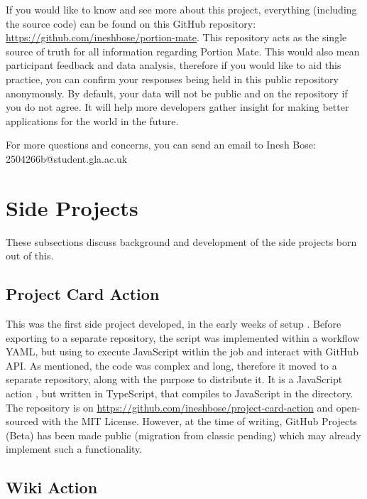 \documentclass[../main.tex]{subfiles}
\begin{document}
If you would like to know and see more about this project, everything (including the source code) can be found on this GitHub repository: \href{https://github.com/ineshbose/portion-mate}{https://github.com/ineshbose/portion-mate}. This repository acts as the single source of truth for all information regarding Portion Mate. This would also mean participant feedback and data analysis, therefore if you would like to aid this practice, you can confirm your responses being held in this public repository anonymously. By default, your data will not be public and on the repository if you do not agree. It will help more developers gather insight for making better applications for the world in the future.

For more questions and concerns, you can send an email to Inesh Bose: 2504266b@student.gla.ac.uk

\section[Side Projects Appendix]{Side Projects}

These subsections discuss background and development of the side projects born out of this.

\subsection{Project Card Action}

This was the first side project developed, in the early weeks of setup \cite{issue28}. Before exporting to a separate repository, the script was implemented within a workflow YAML, but using  to execute JavaScript within the job and interact with GitHub API. As mentioned, the code was complex and long, therefore it moved to a separate repository, along with the purpose to distribute it. It is a JavaScript action \cite{CreatingJavaScriptAction}, but written in TypeScript, that compiles to JavaScript in the  directory. The repository is on \href{https://github.com/ineshbose/project-card-action}{https://github.com/ineshbose/project-card-action} and open-sourced with the MIT License. However, at the time of writing, GitHub Projects (Beta) has been made public (migration from classic pending) which may already implement such a functionality.

\subsection{Wiki Action}
\end{document}
